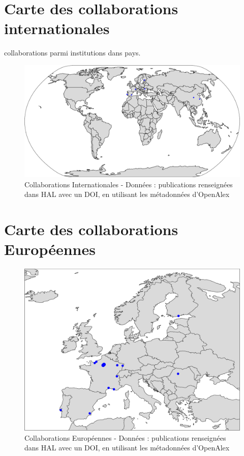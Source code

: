 \documentclass[french, 11pt]{dibiso/biso}
\begin{document}
\pagebreak

\section{Carte des collaborations internationales}

{\collaborationsnb} collaborations parmi {\institutionsnb} institutions dans {\countriesnb} pays.

\begin{figure}[!h]
  \hspace{-.1\textwidth}\includegraphics[width=1.2\textwidth]{figures/collaboration_map_world.pdf}
  \caption{Collaborations Internationales - Données : publications renseignées dans HAL avec un DOI, en utilisant les métadonnées d'OpenAlex}
  \label{fig_collab_map}
\end{figure}

\pagebreak

\section{Carte des collaborations Européennes}

\begin{figure}[!h]
  \includegraphics[width=\textwidth]{figures/collaboration_map_europe.pdf}
  \caption{Collaborations Européennes - Données : publications renseignées dans HAL avec un DOI, en utilisant les métadonnées d'OpenAlex}
  \label{fig_collab_map_europe}
\end{figure}
\end{document}
